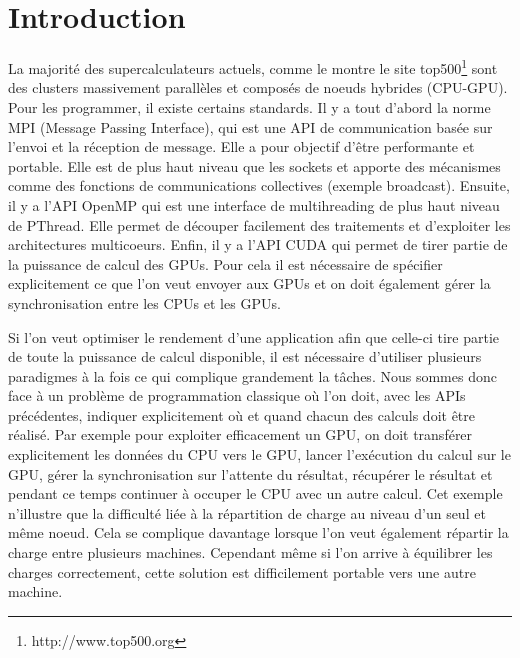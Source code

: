 \documentclass[smallextended]{svjour3}
\begin{document}
\section{Introduction}
\label{sec-1}

La majorité des supercalculateurs actuels, comme le montre le site
top500\footnote{http://www.top500.org} sont des clusters
massivement parallèles et composés de noeuds hybrides
(CPU-GPU). Pour les programmer, il existe certains standards. Il y a
tout d'abord la norme MPI (Message Passing Interface), qui est une
API de communication basée sur l'envoi et la réception de
message. Elle a pour objectif d'être performante et portable.  Elle
est de plus haut niveau que les sockets et apporte des mécanismes
comme des fonctions de communications collectives (exemple
broadcast). Ensuite, il y a l'API OpenMP qui est une interface de
multihreading de plus haut niveau de PThread. Elle permet de
découper facilement des traitements et d'exploiter les architectures
multicoeurs. Enfin, il y a l'API CUDA qui permet de tirer partie de
la puissance de calcul des GPUs. Pour cela il est nécessaire de
spécifier explicitement ce que l'on veut envoyer aux GPUs et on doit
également gérer la synchronisation entre les CPUs et les GPUs. 

Si l'on veut optimiser le rendement d'une application afin que
celle-ci tire partie de toute la puissance de calcul disponible, il
est nécessaire d'utiliser plusieurs paradigmes à la fois ce qui
complique grandement la tâches. Nous sommes donc face à un problème 
de programmation classique où l'on doit, avec les APIs précédentes,
indiquer explicitement où et quand chacun des calculs doit être 
réalisé. Par exemple pour exploiter efficacement un GPU, on doit
transférer explicitement les données du CPU vers le GPU, lancer
l'exécution du calcul sur le GPU, gérer la synchronisation sur
l'attente du résultat, récupérer le résultat et pendant ce temps
continuer à occuper le CPU avec un autre calcul. Cet exemple
n'illustre que la difficulté liée à la répartition de charge au
niveau d'un seul et même noeud. Cela se complique davantage lorsque
l'on veut également répartir la charge entre plusieurs machines. 
Cependant même si l'on arrive à équilibrer les charges correctement,
cette solution est difficilement portable vers une autre machine.  
\end{document}
